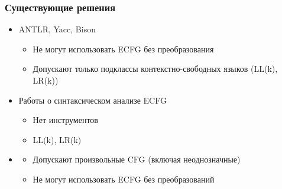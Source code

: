 \documentclass{beamer}
\begin{document}
\begin{frame}
	\begin{center} 
	\end{center}
\end{frame}

	
	\begin{frame} 
		\frametitle{Существующие решения} 
		\begin{itemize}
			\item<1-> ANTLR, Yacc, Bison
			 \begin{itemize}
			 	\item<2-> Не могут использовать ECFG без преобразования
			 	\item<2-> Допускают только подклассы контекстно-свободных языков (LL(k), LR(k))
			 \end{itemize} 
			\item<3-> Работы о синтаксическом анализе ECFG
			\begin{itemize}
				\item<4-> Нет инструментов
				\item<4-> LL(k), LR(k)
			\end{itemize}
			\item<5-> 
			\begin{itemize}
				\item<6-> Допускают произвольные CFG (включая неоднозначные)
				\item<6-> Не могут использовать ECFG без преобразований
			\end{itemize}
		\end{itemize}
	\end{frame}
\end{document}
